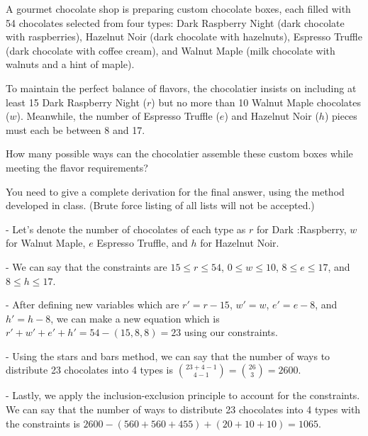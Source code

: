 \documentclass{article}
\begin{document}
\begin{problem}
A gourmet chocolate shop is preparing custom chocolate boxes, each filled with 54 chocolates selected from four types: Dark Raspberry Night (dark chocolate with raspberries), Hazelnut Noir (dark chocolate with hazelnuts), Espresso Truffle (dark chocolate with coffee cream), and Walnut Maple  (milk chocolate with walnuts and a hint of maple).

\noindent To maintain the perfect balance of flavors, the chocolatier insists on including at least 15 Dark Raspberry Night ($r$) but no more than 10 Walnut Maple chocolates  ($w$). Meanwhile, the number of Espresso Truffle  ($e$) and Hazelnut Noir  ($h$) pieces must each be between 8 and 17.

\noindent How many possible ways can the chocolatier assemble these custom boxes while meeting the flavor requirements?

\noindent You need to give a complete derivation for the final answer, using the method developed in class. 
(Brute force listing of all lists will not be accepted.)

\vspace{0.1in} - Let's denote the number of chocolates of each type as $r$ for Dark :Raspberry, $w$ for Walnut Maple, $e$ Espresso Truffle, and $h$ for Hazelnut Noir.

\vspace{0.1in} - We can say that the constraints are $15 \leq r \leq 54$, $0 \leq w \leq 10$, $8 \leq e \leq 17$, and $8 \leq h \leq 17$.

\vspace{0.1in} - After defining new variables which are $r'=r-15$, $w'=w$, $e'=e-8$, and $h'=h-8$, we can make a new equation which is $r'+w'+e'+h'=54-(15,8,8)=23$ using our constraints.

\vspace{0.1in} - Using the stars and bars method, we can say that the number of ways to distribute 23 chocolates into 4 types is $\binom{23+4-1}{4-1}=\binom{26}{3}=2600$.

\vspace{0.1in} - Lastly, we apply the inclusion-exclusion principle to account for the constraints. We can say that the number of ways to distribute 23 chocolates into 4 types with the constraints is $2600-(560+560+455)+(20+10+10)=1065$.

\end{problem}



\end{document}
